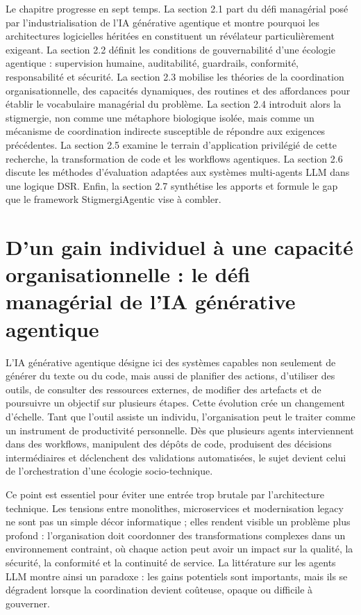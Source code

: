 Le chapitre progresse en sept temps. La section 2.1 part du défi managérial posé par l'industrialisation de l'IA générative agentique et montre pourquoi les architectures logicielles héritées en constituent un révélateur particulièrement exigeant. La section 2.2 définit les conditions de gouvernabilité d'une écologie agentique : supervision humaine, auditabilité, guardrails, conformité, responsabilité et sécurité. La section 2.3 mobilise les théories de la coordination organisationnelle, des capacités dynamiques, des routines et des affordances pour établir le vocabulaire managérial du problème. La section 2.4 introduit alors la stigmergie, non comme une métaphore biologique isolée, mais comme un mécanisme de coordination indirecte susceptible de répondre aux exigences précédentes. La section 2.5 examine le terrain d'application privilégié de cette recherche, la transformation de code et les workflows agentiques. La section 2.6 discute les méthodes d'évaluation adaptées aux systèmes multi-agents LLM dans une logique DSR. Enfin, la section 2.7 synthétise les apports et formule le gap que le framework StigmergiAgentic vise à combler.

\section{D'un gain individuel à une capacité organisationnelle : le défi managérial de l'IA générative agentique}\label{sec:rev-defi-managerial}

L'IA générative agentique désigne ici des systèmes capables non seulement de générer du texte ou du code, mais aussi de planifier des actions, d'utiliser des outils, de consulter des ressources externes, de modifier des artefacts et de poursuivre un objectif sur plusieurs étapes. Cette évolution crée un changement d'échelle. Tant que l'outil assiste un individu, l'organisation peut le traiter comme un instrument de productivité personnelle. Dès que plusieurs agents interviennent dans des workflows, manipulent des dépôts de code, produisent des décisions intermédiaires et déclenchent des validations automatisées, le sujet devient celui de l'orchestration d'une écologie socio-technique.

Ce point est essentiel pour éviter une entrée trop brutale par l'architecture technique. Les tensions entre monolithes, microservices et modernisation legacy ne sont pas un simple décor informatique ; elles rendent visible un problème plus profond : l'organisation doit coordonner des transformations complexes dans un environnement contraint, où chaque action peut avoir un impact sur la qualité, la sécurité, la conformité et la continuité de service. La littérature sur les agents LLM montre ainsi un paradoxe : les gains potentiels sont importants, mais ils se dégradent lorsque la coordination devient coûteuse, opaque ou difficile à gouverner.

